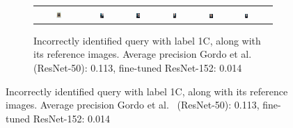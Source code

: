\begin{figure}
\begin{subfigure}{\textwidth}
\begin{tabular}{|c|*{6}{c}}
\includegraphics[width=0.12\textwidth]{img/1C-0454.JPG} &
\includegraphics[width=0.12\textwidth]{img/1C-0.JPG} &
\includegraphics[width=0.12\textwidth]{img/1C-1.JPG} &
\includegraphics[width=0.12\textwidth]{img/1C-2.JPG} &
\includegraphics[width=0.12\textwidth]{img/1C-3.JPG} &
\includegraphics[width=0.12\textwidth]{img/1C-4.JPG} \\
\end{tabular}
\caption{Incorrectly identified query with label 1C,
along with its reference images.\newline
Average precision Gordo et al.~\cite{gordo_deep_2016} (ResNet-50): 0.113,
fine-tuned ResNet-152: 0.014
\label{fig:incorrect1C}}
\end{subfigure}


\end{figure}
